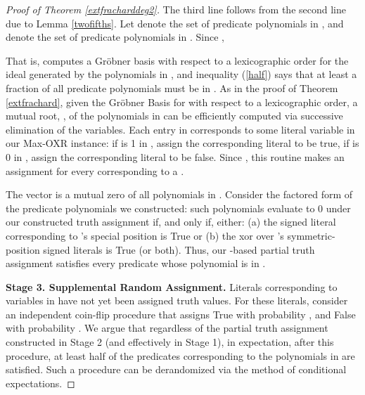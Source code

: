 \documentclass{article}
\begin{document}
\begin{proof}[Proof of Theorem \ref{extfracharddeg2}]
\vspace{-5mm}



\noindent The third line follows from the second line due to Lemma \ref{twofifths}. Let  denote the set of predicate polynomials in , and  denote the set of predicate polynomials in . Since ,







That is,  computes a Gr\"{o}bner basis with respect to a lexicographic order for the ideal generated by the polynomials in , and inequality (\ref{half}) says that at least a  fraction of all predicate polynomials must be in . 
As in the proof of Theorem \ref{extfrachard}, given the Gr\"{o}bner Basis for  with respect to a lexicographic order, a mutual root, , of the polynomials in  can be efficiently computed via successive elimination of the variables. Each entry in  corresponds to some literal variable in our Max-OXR instance:
if  is 1 in , assign the corresponding literal  to be true, if  is 0 in , assign the corresponding literal  to be false. Since , this routine makes an assignment for every  corresponding to a  . 

The vector  is a mutual zero of all polynomials in .
Consider the factored form of the predicate polynomials we constructed: such polynomials evaluate to 0 under our constructed truth assignment if, and only if, either: (a) the signed literal corresponding to 's special position is True or (b) the xor over 's symmetric-position signed literals is True (or both). Thus, 
our -based partial truth assignment satisfies every predicate whose polynomial is in .

\vspace{2mm}

\noindent \textbf{Stage 3. Supplemental Random Assignment.} Literals corresponding to variables in  have not yet been assigned truth values. For these literals, consider an independent coin-flip procedure that assigns True with probability , and False with probability . We argue that regardless of the partial truth assignment constructed in Stage 2 (and effectively in Stage 1), in expectation, after this procedure, at least half of the predicates corresponding to the polynomials in  are satisfied. Such a procedure can be derandomized via the method of conditional expectations.


\end{proof}
\end{document}
